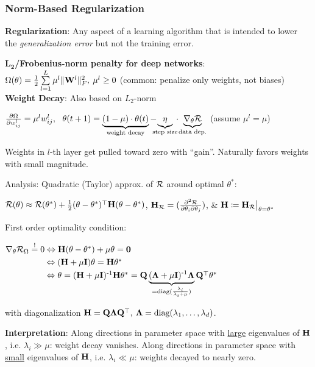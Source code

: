     \subsubsection{Norm-Based Regularization}
    \label{ssub:normbasedregularization}
        \textbf{Regularization}: Any aspect of a learning algorithm that is intended to lower the \emph{generalization error} but not the training error.
        
        \textbf{$\mathbf{L_2}$/Frobenius-norm penalty for deep networks}:\\ \tab$\Omega(\theta)=\frac{1}{2}\sum\limits_{l=1}^L\mu^l\lVert\mathbf W^l\rVert^2_F,\>\mu^l\geq0$ \begingroup\tiny{(common: penalize only weights, not biases)}\endgroup\\
        
        \textbf{Weight Decay}: Also based on $L_2$-norm
        
        \tab$\frac{\partial \Omega}{\partial w^l_{ij}}=\mu^l w^l_{ij},\>\>\>\theta(t+1)=\underbrace{(1-\mu)\cdot\theta(t)}_\text{weight decay}-\!\!\!\!\underbrace{\eta}_\text{step size}\!\!\cdot\!\underbrace{\nabla_\theta\mathcal{R}}_\text{data dep.}$ (assume $\mu^l=\mu$)
        
        Weights in $l$-th layer get pulled toward zero with ``gain''. Naturally favors weights with small magnitude.
        
        Analysis: Quadratic (Taylor) approx. of $\mathcal{R}$ around optimal $\theta^*$:

        \tab$\mathcal{R}(\theta)\approx\mathcal{R}(\theta^*)+\frac{1}{2}(\theta-\theta^*)^{\mathop{\mathrm{\top}}}\mathbf H(\theta-\theta^*)$, $\mathbf H_{\mathcal{R}}=(\frac{\partial^2\mathcal{R}}{\partial\theta_i\partial\theta_j})$, \& $\mathbf H\coloneqq\mathbf H_{\mathcal{R}}\bigr|_{\theta=\theta^*}$
        
        First order optimality condition:
        
        \tab$\nabla_\theta\mathcal{R}_\Omega\overset{!}{=}0\Leftrightarrow\mathbf H(\theta-\theta^*)+\mu\theta=\mathbf{0}$\\
        \tab$\phantom{\nabla_\theta\cR_\Omega\overset{!}{=}0}\Leftrightarrow(\vH+\mu\vI)\theta=\vH\theta^*$\\
        \tab$\phantom{\nabla_\theta\cR_\Omega\overset{!}{=}0}\Leftrightarrow\theta=(\vH+\mu\vI)\inv\vH\theta^*=\vQ\underbrace{(\vLa+\mu\vI)\inv\vLa}_{=\text{diag}(\frac{\lambda_i}{\lambda_i+\mu})}\vQ\T\theta^*$
        
        \tab with diagonalization $\mathbf H=\mathbf Q\mathbf \Lambda\mathbf Q^{\mathop{\mathrm{\top}}},\>\mathbf \Lambda=\text{diag}(\lambda_1,\ldots,\lambda_d)$.
        
        \textbf{Interpretation}: Along directions in parameter space with \underline{large} eigenvalues of $\mathbf H$, i.e. $\lambda_i\gg\mu$: weight decay vanishes. Along directions in parameter space with \underline{small} eigenvalues of $\mathbf H$, i.e. $\lambda_i\ll\mu$: weights decayed to nearly zero.
        
